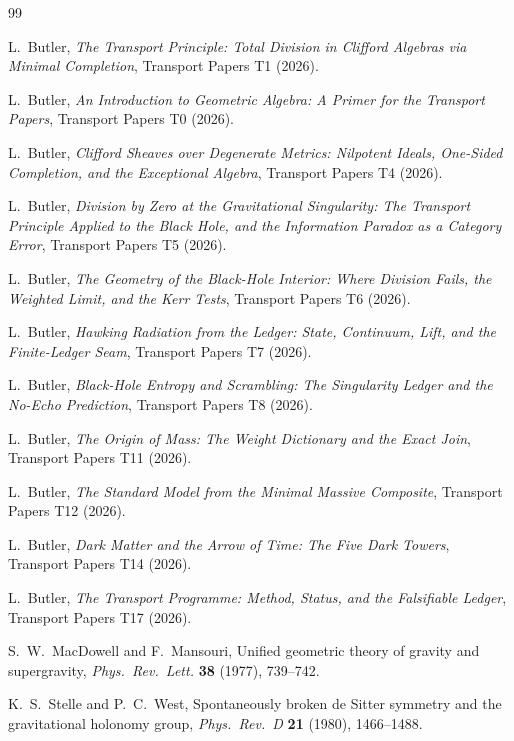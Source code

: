 \documentclass[11pt]{article}
\theoremstyle{definition}
\begin{document}
\begin{thebibliography}{99}

L.~Butler,
\emph{The Transport Principle: Total Division in Clifford Algebras via Minimal Completion},
Transport Papers T1 (2026).

L.~Butler,
\emph{An Introduction to Geometric Algebra: A Primer for the Transport Papers},
Transport Papers T0 (2026).

L.~Butler,
\emph{Clifford Sheaves over Degenerate Metrics: Nilpotent Ideals, One-Sided Completion, and the Exceptional Algebra},
Transport Papers T4 (2026).

L.~Butler,
\emph{Division by Zero at the Gravitational Singularity: The Transport Principle Applied to the Black Hole, and the Information Paradox as a Category Error},
Transport Papers T5 (2026).

L.~Butler,
\emph{The Geometry of the Black-Hole Interior: Where Division Fails, the Weighted Limit, and the Kerr Tests},
Transport Papers T6 (2026).

L.~Butler,
\emph{Hawking Radiation from the Ledger: State, Continuum, Lift, and the Finite-Ledger Seam},
Transport Papers T7 (2026).

L.~Butler,
\emph{Black-Hole Entropy and Scrambling: The Singularity Ledger and the No-Echo Prediction},
Transport Papers T8 (2026).

L.~Butler,
\emph{The Origin of Mass: The Weight Dictionary and the Exact Join},
Transport Papers T11 (2026).

L.~Butler,
\emph{The Standard Model from the Minimal Massive Composite},
Transport Papers T12 (2026).

L.~Butler,
\emph{Dark Matter and the Arrow of Time: The Five Dark Towers},
Transport Papers T14 (2026).

L.~Butler,
\emph{The Transport Programme: Method, Status, and the Falsifiable Ledger},
Transport Papers T17 (2026).

S.~W.~MacDowell and F.~Mansouri,
Unified geometric theory of gravity and supergravity,
\emph{Phys.\ Rev.\ Lett.} \textbf{38} (1977), 739--742.

K.~S.~Stelle and P.~C.~West,
Spontaneously broken de Sitter symmetry and the gravitational holonomy group,
\emph{Phys.\ Rev.\ D} \textbf{21} (1980), 1466--1488.


\end{thebibliography}
\end{document}
